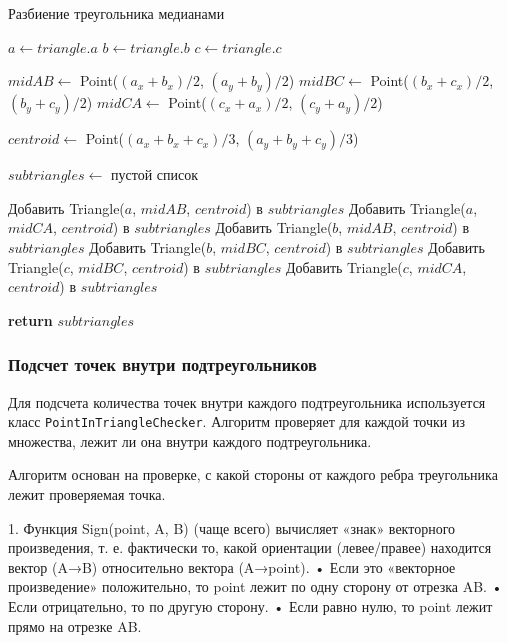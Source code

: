 \documentclass[a4paper,12pt]{article}
\begin{document}
\begin{algorithm}
\caption{Разбиение треугольника медианами}
\begin{algorithmic}[1]
    \State $a \gets triangle.a$
    \State $b \gets triangle.b$
    \State $c \gets triangle.c$
    
    \State $midAB \gets$ Point($(a_x + b_x) / 2$, $(a_y + b_y) / 2$)
    \State $midBC \gets$ Point($(b_x + c_x) / 2$, $(b_y + c_y) / 2$)
    \State $midCA \gets$ Point($(c_x + a_x) / 2$, $(c_y + a_y) / 2$)
    
    \State $centroid \gets$ Point($(a_x + b_x + c_x) / 3$, $(a_y + b_y + c_y) / 3$)
    
    \State $subtriangles \gets$ пустой список
    
    \State Добавить Triangle($a$, $midAB$, $centroid$) в $subtriangles$
    \State Добавить Triangle($a$, $midCA$, $centroid$) в $subtriangles$
    \State Добавить Triangle($b$, $midAB$, $centroid$) в $subtriangles$
    \State Добавить Triangle($b$, $midBC$, $centroid$) в $subtriangles$
    \State Добавить Triangle($c$, $midBC$, $centroid$) в $subtriangles$
    \State Добавить Triangle($c$, $midCA$, $centroid$) в $subtriangles$
    
    \State \textbf{return} $subtriangles$
\EndProcedure
\end{algorithmic}
\end{algorithm}

\subsubsection{Подсчет точек внутри подтреугольников}

Для подсчета количества точек внутри каждого подтреугольника используется класс \texttt{PointInTriangleChecker}. Алгоритм проверяет для каждой точки из множества, лежит ли она внутри каждого подтреугольника.

Алгоритм основан на проверке, с какой стороны от каждого ребра треугольника лежит проверяемая точка. 

1. Функция Sign(point, A, B) (чаще всего) вычисляет «знак» векторного произведения, т. е. фактически то, какой ориентации (левее/правее) находится вектор (A→B) относительно вектора (A→point).  
   • Если это «векторное произведение» положительно, то point лежит по одну сторону от отрезка AB.  
   • Если отрицательно, то по другую сторону.  
   • Если равно нулю, то point лежит прямо на отрезке AB.
\end{document}
